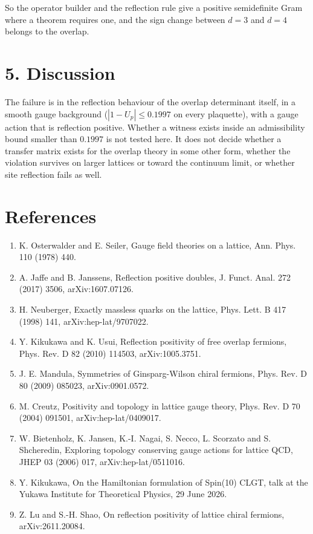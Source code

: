 \documentclass[11pt,a4paper]{article}
\begin{document}
So the operator builder and the reflection rule give a positive semidefinite Gram where a theorem requires one, and the sign change between $d=3$ and $d=4$ belongs to the overlap.


\section*{5. Discussion}
The failure is in the reflection behaviour of the overlap determinant itself, in a smooth gauge background ($|1-U_p|\le0.1997$ on every plaquette), with a gauge action that is reflection positive. Whether a witness exists inside an admissibility bound smaller than $0.1997$ is not tested here. It does not decide whether a transfer matrix exists for the overlap theory in some other form, whether the violation survives on larger lattices or toward the continuum limit, or whether site reflection fails as well.


\section*{References}
\begin{enumerate}
\item{} K. Osterwalder and E. Seiler, Gauge field theories on a lattice, Ann. Phys. 110 (1978) 440.
\item{} A. Jaffe and B. Janssens, Reflection positive doubles, J. Funct. Anal. 272 (2017) 3506, arXiv:1607.07126.
\item{} H. Neuberger, Exactly massless quarks on the lattice, Phys. Lett. B 417 (1998) 141, arXiv:hep-lat/9707022.
\item{} Y. Kikukawa and K. Usui, Reflection positivity of free overlap fermions, Phys. Rev. D 82 (2010) 114503, arXiv:1005.3751.
\item{} J. E. Mandula, Symmetries of Ginsparg-Wilson chiral fermions, Phys. Rev. D 80 (2009) 085023, arXiv:0901.0572.
\item{} M. Creutz, Positivity and topology in lattice gauge theory, Phys. Rev. D 70 (2004) 091501, arXiv:hep-lat/0409017.
\item{} W. Bietenholz, K. Jansen, K.-I. Nagai, S. Necco, L. Scorzato and S. Shcheredin, Exploring topology conserving gauge actions for lattice QCD, JHEP 03 (2006) 017, arXiv:hep-lat/0511016.
\item{} Y. Kikukawa, On the Hamiltonian formulation of Spin(10) CLGT, talk at the Yukawa Institute for Theoretical Physics, 29 June 2026.
\item{} Z. Lu and S.-H. Shao, On reflection positivity of lattice chiral fermions, arXiv:2611.20084.
\end{enumerate}
\end{document}
